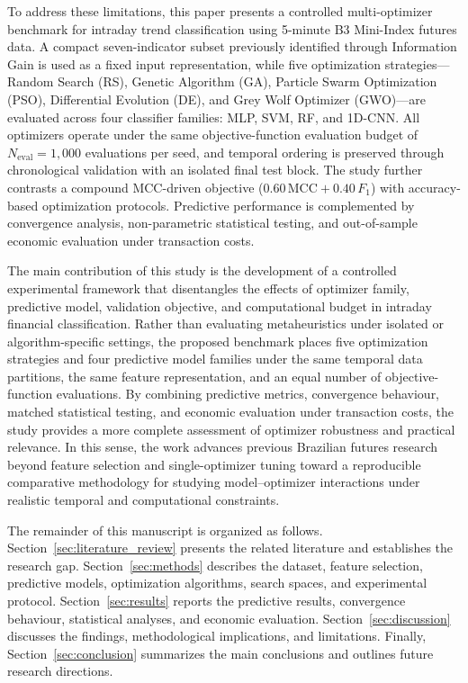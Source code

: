 To address these limitations, this paper presents a controlled multi-optimizer benchmark for intraday trend classification using 5-minute B3 Mini-Index futures data. A compact seven-indicator subset previously identified through Information Gain is used as a fixed input representation, while five optimization strategies---Random Search (RS), Genetic Algorithm (GA), Particle Swarm Optimization (PSO), Differential Evolution (DE), and Grey Wolf Optimizer (GWO)---are evaluated across four classifier families: MLP, SVM, RF, and 1D-CNN. All optimizers operate under the same objective-function evaluation budget of $N_{\mathrm{eval}} = 1{,}000$ evaluations per seed, and temporal ordering is preserved through chronological validation with an isolated final test block. The study further contrasts a compound MCC-driven objective ($0.60\,\mathrm{MCC} + 0.40\,F_1$) with accuracy-based optimization protocols. Predictive performance is complemented by convergence analysis, non-parametric statistical testing, and out-of-sample economic evaluation under transaction costs.

The main contribution of this study is the development of a controlled experimental framework that disentangles the effects of optimizer family, predictive model, validation objective, and computational budget in intraday financial classification. Rather than evaluating metaheuristics under isolated or algorithm-specific settings, the proposed benchmark places five optimization strategies and four predictive model families under the same temporal data partitions, the same feature representation, and an equal number of objective-function evaluations. By combining predictive metrics, convergence behaviour, matched statistical testing, and economic evaluation under transaction costs, the study provides a more complete assessment of optimizer robustness and practical relevance. In this sense, the work advances previous Brazilian futures research beyond feature selection and single-optimizer tuning toward a reproducible comparative methodology for studying model--optimizer interactions under realistic temporal and computational constraints.

The remainder of this manuscript is organized as follows. Section~\ref{sec:literature_review} presents the related literature and establishes the research gap. Section~\ref{sec:methods} describes the dataset, feature selection, predictive models, optimization algorithms, search spaces, and experimental protocol. Section~\ref{sec:results} reports the predictive results, convergence behaviour, statistical analyses, and economic evaluation. Section~\ref{sec:discussion} discusses the findings, methodological implications, and limitations. Finally, Section~\ref{sec:conclusion} summarizes the main conclusions and outlines future research directions.